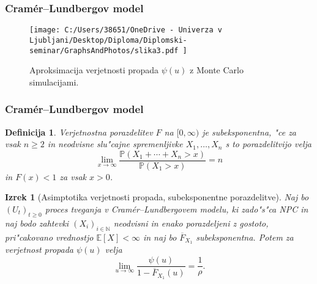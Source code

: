 \documentclass[handout]{beamer} %
\theoremstyle{plain}
\newtheorem{izrek}{Izrek}
\newtheorem{definicija}{Definicija}
\newcommand{\N}{\mathbb{N}}
\newcommand{\E}{\mathbb{E}}
\newcommand{\Prob}{\mathbb{P}}
\begin{document}
\begin{frame}
  \frametitle{Cramér--Lundbergov model}
  \begin{figure}[H]
    \centering
    \texttt{[image: 
        C:/Users/38651/OneDrive - Univerza v Ljubljani/Desktop/Diploma/Diplomski-seminar/GraphsAndPhotos/slika3.pdf
        ]}
    \caption{Aproksimacija verjetnosti propada $\psi(u)$ z Monte Carlo simulacijami.}
    \label{fig:slika4}
\end{figure}
\end{frame}

\begin{frame}
  \frametitle{Cramér--Lundbergov model}
  \begin{definicija}
    Verjetnostna porazdelitev $F$ na $[0, \infty)$ je \textit{subeksponentna}, "ce za vsak $n\geq2$ in 
    neodvisne slu"cajne spremenljivke $X_1, \dots, X_n$ s to porazdelitvijo velja 
    \begin{equation*}
        \lim_{x\to\infty}\frac{\Prob\left(X_1 + \cdots + X_n > x\right)}{\Prob\left(X_1 > x\right)} = n
    \end{equation*}
    in $F(x) < 1$ za vsak $x > 0$.
    \label{def:subeksponentnaPorazdelitev}
  \end{definicija}
  \pause
  \begin{izrek}[Asimptotika verjetnosti propada, subeksponentne porazdelitve]
    Naj bo $(U_t)_{t\geq0}$ proces tveganja v Cramér--Lundbergovem modelu, ki zado"s"ca NPC in 
    naj bodo zahtevki $(X_i)_{i\in\N}$ neodvisni in enako porazdeljeni z gostoto, 
    pri"cakovano vrednostjo $\E\left[X\right] < \infty$ in naj bo $\overline{F}_{X_1}$ subeksponentna.
    Potem za verjetnost propada $\psi(u)$ velja
    \begin{equation*}
        \lim_{u\to\infty}\frac{\psi(u)}{1 - \overline{F}_{X_1}(u)} = \frac{1}{\rho}.
        \label{eq:tezkorepnePorazdelitveAsimptotika}
    \end{equation*}
    \label{izr:tezkorepnePorazdelitveAsimptotika}
  \end{izrek}
\end{frame}
\end{document}
